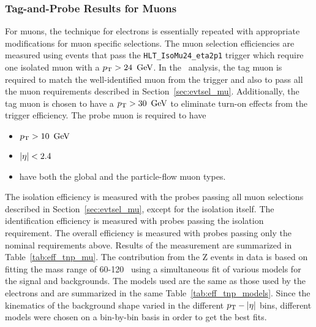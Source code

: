 \subsubsection{Tag-and-Probe Results for Muons}
\label {sec:eff_tnp_mu}
For muons, the technique for electrons is essentially repeated with appropriate
modifications for muon specific selections. The muon selection efficiencies are
measured using events that pass the \verb=HLT_IsoMu24_eta2p1= trigger which
require one isolated muon with a $p_{\mathrm{T}}>24\ \,\text{Ge\hspace{-.08em}V}$. In the \tnp~analysis, the
tag muon is required to match the well-identified muon from the trigger and
also to pass all the muon requirements described in Section~\ref{sec:evtsel_mu}.
Additionally, the tag muon is chosen to have a $\pt>30\ \GeV$ to eliminate
turn-on effects from the trigger efficiency. The probe muon is required to have
\begin{itemize}
  \item $p_{\mathrm{T}} > 10\ \,\text{Ge\hspace{-.08em}V}$
  \item $\left|\eta\right| < 2.4$
  \item have both the global and the particle-flow muon types.
\end{itemize}
The isolation efficiency is measured with the probes passing all muon
selections described in Section~\ref{sec:evtsel_mu}, except for the isolation
itself. The identification efficiency is measured with probes passing the
isolation requirement. The overall efficiency is measured with probes passing
only the nominal requirements above. Results of the measurement are summarized
in Table~\ref{tab:eff_tnp_mu}. The contribution from the Z events in data
is based on fitting the mass range of 60-120 \GeVcc~using a simultaneous
fit of various models for the signal and backgrounds. The models used are
the same as those used by the electrons and are summarized in the same
Table~\ref{tab:eff_tnp_models}. Since the kinematics of the background shape
varied in the different $p_{\mathrm{T}}-\left|\eta\right|$ bins, different models were chosen on a
bin-by-bin basis in order to get the best fits.
